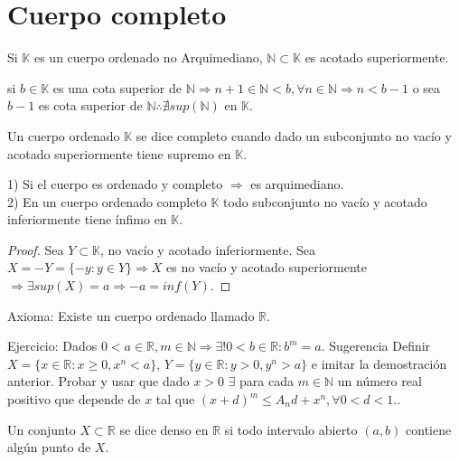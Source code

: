 \section{Cuerpo completo}

\begin{definition}
    Si $\mathbb{K}$ es un cuerpo ordenado no Arquimediano, $\mathbb{N} \subset \mathbb{K}$ es acotado superiormente.
\end{definition}

si $b \in \mathbb{K}$ es una cota superior de $\mathbb{N} \Rightarrow n+1 \in \mathbb{N}<b, \forall n \in \mathbb{N} \Rightarrow n < b-1$ o sea $b-1$ es cota superior de $\mathbb{N} \therefore \nexists sup(\mathbb{N})$ en $\mathbb{K}$.

\begin{definition}
    Un cuerpo ordenado $\mathbb{K}$ se dice completo cuando dado un subconjunto no vacío y acotado superiormente tiene supremo en $\mathbb{K}$.
\end{definition}

\begin{note}
    1) Si el cuerpo es ordenado y completo $\Rightarrow$ es arquimediano. \\
    2) En un cuerpo ordenado completo $\mathbb{K}$ todo subconjunto no vacío y acotado inferiormente tiene ínfimo en $\mathbb{K}$.
    \begin{proof}
        Sea $Y \subset \mathbb{K}$, no vacío y acotado inferiormente. Sea $X = -Y = \{ -y:y \in Y \} \Rightarrow X$ es no vacío y acotado superiormente $\Rightarrow \exists sup(X)=a \Rightarrow -a=inf(Y)$.
    \end{proof}
\end{note}

Axioma: Existe un cuerpo ordenado llamado $\mathbb{R}$.


Ejercicio: Dados $0<a \in \mathbb{R}, m \in \mathbb{N} \Rightarrow \exists! 0<b\in \mathbb{R} : b^m =a$. Sugerencia Definir $X = \{ x \in \mathbb{R} : x\geq0, x^n<a \}$, $Y = \{ y \in \mathbb{R} : y>0, y^n >a \}$ e imitar la demostración anterior. Probar y usar que dado $x>0$ $\exists$ para cada $m \in \mathbb{N}$ un número real positivo que depende de $x$ tal que $(x+d)^m \leq A_nd+x^n, \forall 0<d<1.$.

\begin{definition}
    Un conjunto $X \subset \mathbb{R}$ se dice denso en $\mathbb{R}$ si todo intervalo abierto $(a, b)$ contiene algún punto de $X$.
\end{definition}

